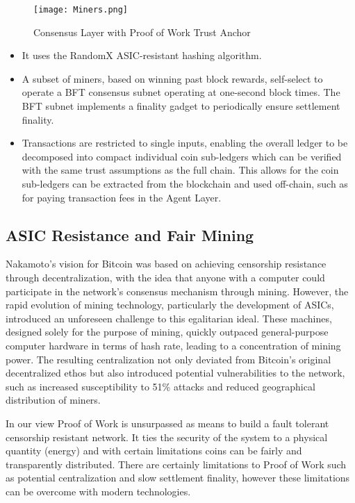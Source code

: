 \documentclass{article}
\begin{document}
\begin{figure}[htbp]
    \centering
    \texttt{[image: Miners.png]}
    \caption{Consensus Layer with Proof of Work Trust Anchor}
    \label{fig:miners}
\end{figure}

\begin{itemize}
\setlength{\leftmargin}{1em}
 \item It uses the RandomX ASIC-resistant hashing algorithm.
 \item A subset of miners, based on winning past block rewards, self-select to operate a BFT consensus subnet operating at one-second block times. The BFT subnet implements a finality gadget to periodically ensure settlement finality.
 \item Transactions are restricted to single inputs, enabling the overall ledger to be decomposed into compact individual coin sub-ledgers which can be verified with the same trust assumptions as the full chain.  This allows for the coin sub-ledgers can be extracted from the blockchain and used off-chain, such as for paying transaction fees in the Agent Layer.
\end{itemize}


\subsection{ASIC Resistance and Fair Mining}

Nakamoto's vision for Bitcoin was based on achieving censorship resistance through decentralization, with the idea that anyone with a computer could participate in the network's consensus mechanism through mining. However, the rapid evolution of mining technology, particularly the development of ASICs, introduced an unforeseen challenge to this egalitarian ideal. These machines, designed solely for the purpose of mining, quickly outpaced general-purpose computer hardware in terms of hash rate, leading to a concentration of mining power. The resulting centralization not only deviated from Bitcoin's original decentralized ethos but also introduced potential vulnerabilities to the network, such as increased susceptibility to 51\% attacks and reduced geographical distribution of miners.

In our view Proof of Work is unsurpassed as means to build a fault tolerant censorship resistant network. It ties the security of the system to a physical quantity (energy) and with certain limitations coins can be fairly and transparently distributed. There are certainly limitations to Proof of Work such as potential centralization and slow settlement finality, however these limitations can be overcome with modern technologies.
\end{document}
